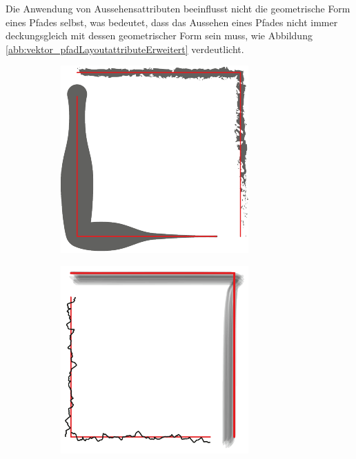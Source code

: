 Die Anwendung von Aussehensattributen beeinflusst nicht die geometrische Form eines Pfades selbst, was bedeutet, dass das Aussehen eines Pfades nicht immer deckungsgleich mit dessen geometrischer Form sein muss, wie Abbildung \ref{abb:vektor_pfadLayoutattributeErweitert} verdeutlicht.

\begin{figure}[h!tbp]
\centering
\begin{subfigure}{.23\textwidth}
  \centering
  \includegraphics[width=.8\linewidth]{bilder/vektor_pfadLayoutattributeErweitertA.pdf}
  \caption{}
\end{subfigure}%
\begin{subfigure}{.23\textwidth}
  \centering
  \includegraphics[width=.8\linewidth]{bilder/vektor_pfadLayoutattributeErweitertB.pdf}

\end{subfigure}
\end{figure}
